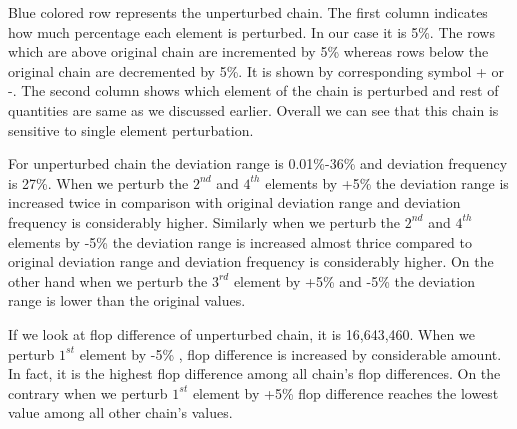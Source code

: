 \documentclass[10pts]{article}
\begin{document}
\vspace*{4pt}

Blue colored row represents the unperturbed chain. The first column indicates how much percentage each element is perturbed. In our case it is 5\%. The rows which are above original chain are incremented by 5\% whereas rows below the original chain are decremented by 5\%. It is shown by corresponding symbol + or -. The second column shows which element of the chain is perturbed and rest of quantities are same as we discussed earlier. Overall we can see that this chain is sensitive to single element perturbation.

For unperturbed chain the deviation range is 0.01\%-36\% and deviation frequency is 27\%.  When we perturb the $2^{nd}$ and $4^{th}$ elements by +5\% the deviation range is increased twice in comparison with original deviation range and deviation frequency is considerably higher. Similarly when we perturb the $2^{nd}$ and $4^{th}$ elements by -5\% the deviation range is increased almost thrice compared to original deviation range and deviation frequency is considerably higher. On the other hand when we perturb the $3^{rd}$ element by +5\% and -5\% the deviation range is lower than the original values.

If we look at flop difference of unperturbed chain, it is 16,643,460. When we perturb $1^{st}$ element by -5\% , flop difference is increased by considerable amount. In fact, it is the highest flop difference among all chain's flop differences. On the contrary when we perturb  $1^{st}$ element by +5\% flop difference reaches the lowest value among all other chain's values.
\end{document}
